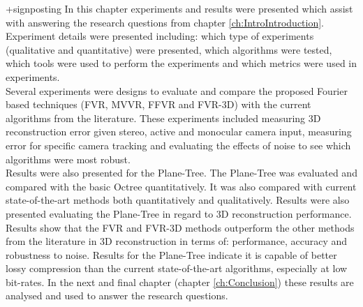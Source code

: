 +signposting
In this chapter experiments and results were presented which assist with answering the research questions from chapter \ref{ch:IntroIntroduction}. Experiment details were presented including: which type of experiments (qualitative and quantitative) were presented, which algorithms were tested, which tools were used to perform the experiments and which metrics were used in experiments. \\

Several experiments were designs to evaluate and compare the proposed Fourier based techniques (FVR, MVVR, FFVR and FVR-3D) with the current algorithms from the literature. These experiments included measuring 3D reconstruction error given stereo, active and monocular camera input, measuring error for specific camera tracking and evaluating the effects of noise to see which algorithms were most robust. \\

Results were also presented for the Plane-Tree. The Plane-Tree was evaluated and compared with the basic Octree quantitatively. It was also compared with current state-of-the-art methods both quantitatively and qualitatively. Results were also presented evaluating the Plane-Tree in regard to 3D reconstruction performance. \\

Results show that the FVR and FVR-3D methods outperform the other methods from the literature in 3D reconstruction in terms of: performance, accuracy and robustness to noise. Results for the Plane-Tree indicate it is capable of better lossy compression than the current state-of-the-art algorithms, especially at low bit-rates. In the next and final chapter (chapter \ref{ch:Conclusion}) these results are analysed and used to answer the research questions. \\


